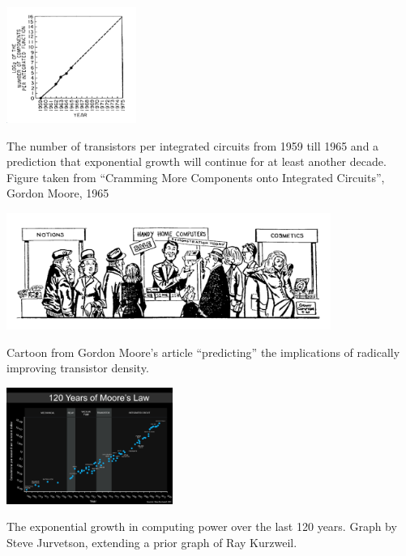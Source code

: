\begin{marginfigure}
\centering
\includegraphics[width=\linewidth, height=1.5in, keepaspectratio]{../figure/gordon_moore.png}
\caption{The number of transistors per integrated circuits from 1959
till 1965 and a prediction that exponential growth will continue for at
least another decade. Figure taken from ``Cramming More Components onto
Integrated Circuits'', Gordon Moore, 1965}
\label{moorefig}
\end{marginfigure}


\begin{marginfigure}
\centering
\includegraphics[width=\linewidth, height=1.5in, keepaspectratio]{../figure/moore_cartoon.png}
\caption{Cartoon from Gordon Moore's article ``predicting'' the
implications of radically improving transistor density.}
\label{moore-cartoon-fig}
\end{marginfigure}


\begin{marginfigure}
\centering
\includegraphics[width=\linewidth, height=1.5in, keepaspectratio]{../figure/1200px-Moore's_Law_over_120_Years.png}
\caption{The exponential growth in computing power over the last 120
years. Graph by Steve Jurvetson, extending a prior graph of Ray
Kurzweil.}
\label{kurzweil-fig}
\end{marginfigure}

